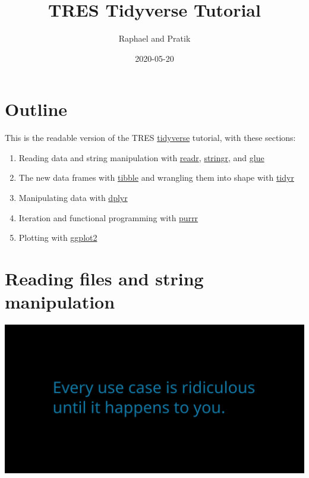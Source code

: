 \documentclass[]{book}
\title{TRES Tidyverse Tutorial}
\author{Raphael and Pratik}
\date{2020-05-20}
\providecommand{\tightlist}{%
  \setlength{\itemsep}{0pt}\setlength{\parskip}{0pt}}
\begin{document}
\maketitle


\linenumbers

{
\setcounter{tocdepth}{1}
\tableofcontents
}
\hypertarget{outline}{%
\chapter*{Outline}\label{outline}}

This is the readable version of the TRES \href{https://www.tidyverse.org/}{tidyverse} tutorial, with these sections:

\begin{enumerate}
\def\labelenumi{\arabic{enumi}.}
\tightlist
\item
  Reading data and string manipulation with \href{https://readr.tidyverse.org/}{readr}, \href{https://stringr.tidyverse.org/}{stringr}, and \href{https://github.com/tidyverse/glue}{glue}\\
\item
  The new data frames with \href{https://tibble.tidyverse.org/}{tibble} and wrangling them into shape with \href{https://tidyr.tidyverse.org/}{tidyr}\\
\item
  Manipulating data with \href{https://dplyr.tidyverse.org/}{dplyr}\\
\item
  Iteration and functional programming with \href{https://purrr.tidyverse.org/}{purrr}\\
\item
  Plotting with \href{https://ggplot2.tidyverse.org/}{ggplot2}
\end{enumerate}

\hypertarget{reading-files-and-string-manipulation}{%
\chapter{Reading files and string manipulation}\label{reading-files-and-string-manipulation}}

\includegraphics{opening-image.png}
\end{document}
